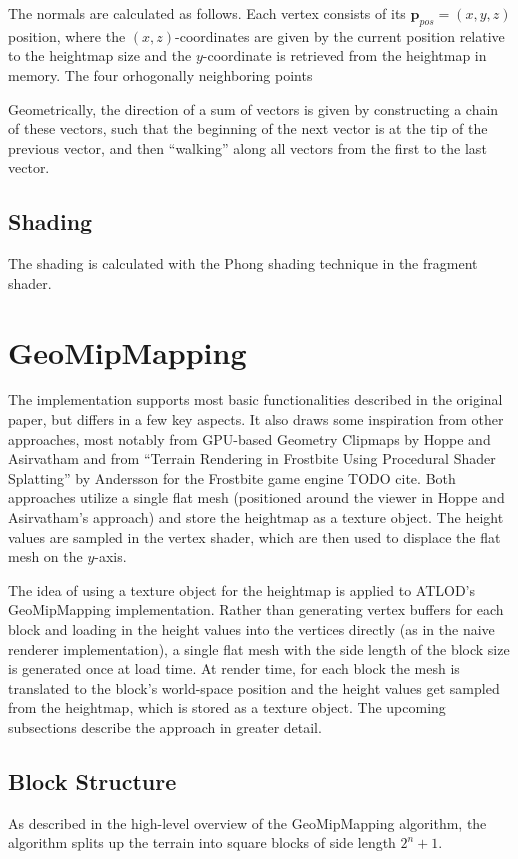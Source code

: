 The normals are calculated as follows. Each vertex consists 
of its $\mathbf{p}_{pos} = (x,y,z)$ position, where the $(x,z)$-coordinates
are given by the current position relative to the heightmap size and the $y$-coordinate is retrieved from the heightmap in memory.
The four orhogonally neighboring points 

Geometrically, the direction of a sum of vectors is given by 
constructing a chain of these vectors, such that the 
beginning of the next vector is at the tip of the previous vector,
and then ``walking'' along all vectors from the first to the last vector.

\subsection{Shading}
The shading is calculated with the Phong shading technique in the fragment shader.

\section{GeoMipMapping}
The implementation supports most basic functionalities described in the original paper, but differs in a few key aspects.
It also draws some inspiration from other approaches, most notably from GPU-based Geometry Clipmaps by Hoppe and Asirvatham
and from ``Terrain Rendering in Frostbite Using Procedural Shader Splatting'' by Andersson for the Frostbite game engine TODO cite.
Both approaches utilize a single flat mesh (positioned around the viewer in Hoppe and Asirvatham's approach) and store the heightmap as a texture object. The height values are sampled in the vertex shader, which are then 
used to displace the flat mesh on the $y$-axis. 

The idea of using a texture object for the heightmap is applied to ATLOD's GeoMipMapping implementation.
Rather than generating vertex buffers for each block and loading in the height values into the vertices directly (as in the naive renderer implementation),
a single flat mesh with the side length of the block size is generated once at load time. At render time, for each block the mesh is translated 
to the block's world-space position and the height values get sampled from the heightmap, which is stored as a texture object.
The upcoming subsections describe the approach in greater detail.

\subsection{Block Structure}
As described in the high-level overview of the GeoMipMapping algorithm, 
the algorithm splits up the terrain into square blocks of side length $2^n+1$.

